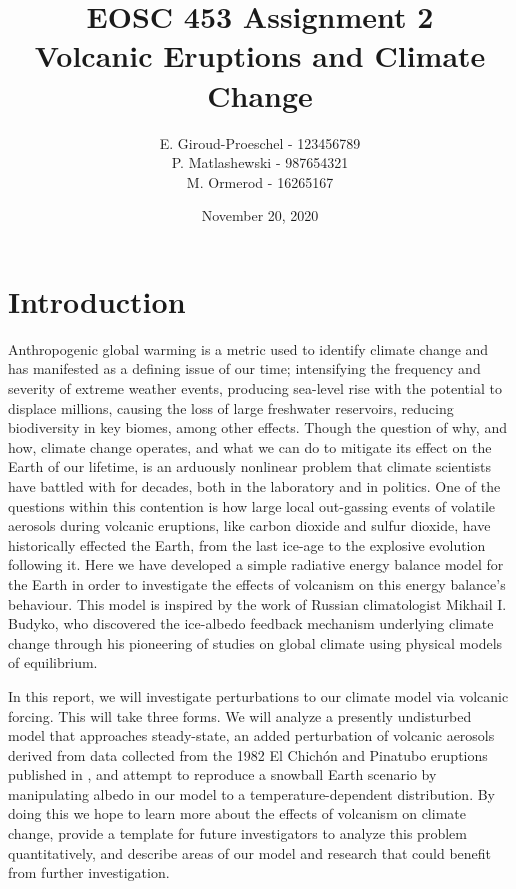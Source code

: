 \documentclass{article}
\title{EOSC 453 Assignment 2\\
\large Volcanic Eruptions and Climate Change}
\author{E. Giroud-Proeschel - 123456789 \\
P. Matlashewski - 987654321\\
M. Ormerod - 16265167
}
\date{November 20, 2020}
\begin{document}
\maketitle

\tableofcontents

\newpage

\section{Introduction}
Anthropogenic global warming is a metric used to identify climate change and has manifested as a defining issue of our time; intensifying the frequency and severity of extreme weather events, producing sea-level rise with the potential to displace millions, causing the loss of large freshwater reservoirs, reducing biodiversity in key biomes, among other effects. Though the question of why, and how, climate change operates, and what we can do to mitigate its effect on the Earth of our lifetime, is an arduously nonlinear problem that climate scientists have battled with for decades, both in the laboratory and in politics. One of the questions within this contention is how large local out-gassing events of volatile aerosols during volcanic eruptions, like carbon dioxide and sulfur dioxide, have historically effected the Earth, from the last ice-age to the explosive evolution following it. Here we have developed a simple radiative energy balance model for the Earth in order to investigate the effects of volcanism on this energy balance's behaviour. This model is inspired by the work of Russian climatologist Mikhail I. Budyko, who discovered the ice-albedo feedback mechanism underlying climate change through his pioneering of studies on global climate using physical models of equilibrium.

In this report, we will investigate perturbations to our climate model via volcanic forcing. This will take three forms. We will analyze a presently undisturbed model that approaches steady-state, an added perturbation of volcanic aerosols derived from data collected from the 1982 El Chichón and Pinatubo eruptions published in \cite{robock}, and attempt to reproduce a snowball Earth scenario by manipulating albedo in our model to a temperature-dependent distribution. By doing this we hope to learn more about the effects of volcanism on climate change, provide a template for future investigators to analyze this problem quantitatively, and describe areas of our model and research that could benefit from further investigation.
\end{document}
